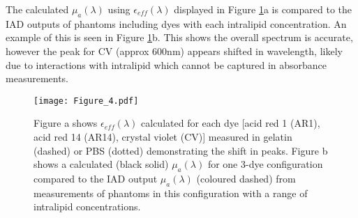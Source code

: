 The calculated $\mu_a(\lambda)$ using $\epsilon_{eff}(\lambda)$ displayed in Figure \ref{fig:Phantombackgrounds}a is compared to the IAD outputs of phantoms including dyes with each intralipid concentration.
An example of this is seen in Figure \ref{fig:Phantombackgrounds}b. This shows the overall spectrum is accurate, however the peak for CV (approx 600nm) appears shifted in wavelength, likely due to interactions with intralipid which cannot be captured in absorbance measurements. 

\begin{figure}[htbp]
    \centering
    \texttt{[image: Figure\_4.pdf]}
    \caption{Figure a shows $\epsilon_{eff}(\lambda)$ calculated for each dye [acid red 1 (AR1), acid red 14 (AR14), crystal violet (CV)] measured in gelatin (dashed) or PBS (dotted) demonstrating the shift in peaks. Figure b shows a calculated (black solid) $\mu_a(\lambda)$ for one 3-dye configuration compared to the IAD output $\mu_a(\lambda)$ (coloured dashed) from measurements of phantoms in this configuration with a range of intralipid concentrations.}
    \label{fig:Phantombackgrounds}
\end{figure}

